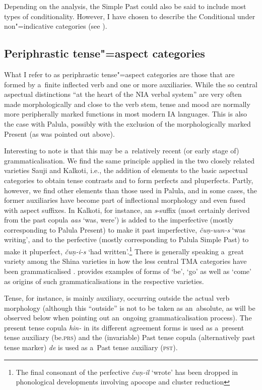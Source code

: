 Depending on the analysis, the Simple Past could also be said to include most types of conditionality. However, I have chosen to describe the Conditional under non"=indicative categories (see ).


\subsection{Periphrastic tense"=aspect categories}
\label{subsec:9-1-5}

What I refer to as periphrastic tense"=aspect categories are those that are formed by a~finite inflected verb and one or more auxiliaries. While the so central aspectual distinctions ``at the heart of the NIA verbal system'' \citep[262]{masica1991} are very often made morphologically and close to the verb stem, tense and mood are normally more peripherally marked functions in most modern IA languages. This is also the case with Palula, possibly with the exclusion of the morphologically marked Present (as was pointed out above). 



Interesting to note is that this may be a~relatively recent (or early stage of) grammaticalisation. We find the same principle applied in the two closely related varieties Sauji and Kalkoti, i.e., the addition of elements to the basic aspectual categories to obtain tense contrasts and to form perfects and pluperfects. Partly, however, we find other elements than those used in Palula, and in some cases, the former auxiliaries have become part of inflectional morphology and even fused with aspect suffixes. In Kalkoti, for instance, an \textit{s}-suffix (most certainly derived from the past copula \textit{aas} `was, were') is added to the imperfective (mostly corresponding to Palula Present) to make it past imperfective, \textit{čuṇ-uun-s} `was writing', and to the perfective (mostly corresponding to Palula Simple Past) to make it pluperfect, \textit{čuṇ-i-s} `had written'.\footnote{The final consonant of the perfective \textit{čuṇ-il} `wrote' has been dropped in phonological developments involving apocope and cluster reduction} There is generally speaking a~great variety among the Shina varieties in how the less central TMA categories have been grammaticalised \citep[144--156]{liljegren2013}. \citet[38]{schmidt2004} provides examples of forms of `be', `go' as well as `come' as origins of such grammaticalisations in the respective varieties. 



Tense, for instance, is mainly auxiliary, occurring outside the actual verb morphology (although this ``outside'' is not to be taken as an~absolute, as will be observed below when pointing out an~ongoing grammaticalisation process). The present tense copula \textit{hin-} in its different agreement forms is used as a~present tense auxiliary (be.\textsc{prs}) and the (invariable) Past tense copula (alternatively past tense marker) \textit{de} is used as a~Past tense auxiliary (\textsc{pst}).



